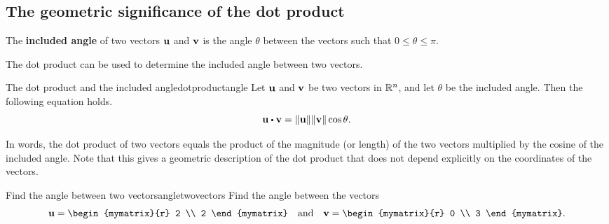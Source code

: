 \subsection{The geometric significance of the dot product}

The \textbf{included angle} of two vectors
$\mbox{\bf u}$ and $\mbox{\bf v}$ is the angle $\theta$ between the vectors
such that $0 \leq \theta \leq \pi$.
\begin{center}
\end{center}
The dot product can be used to determine the included angle between
two vectors.

\begin{proposition}{The dot product and the included angle}{dotproductangle}
  Let $\mbox{\bf u}$ and $\mbox{\bf v}$ be two vectors in $\mathbb{R}^n$, and let 
  $\theta$ be the included angle. Then the following equation holds.
  \begin{equation*}
    \vect{u}\dotprod \vect{v}=\norm{\vect{u}} \norm{\vect{v}} \cos \theta.
  \end{equation*}
\end{proposition}

In words, the dot product of two vectors equals the product of the
magnitude (or length) of the two vectors multiplied by the cosine of
the included angle. Note that this gives a geometric description of
the dot product that does not depend explicitly on the coordinates of
the vectors.

\begin{example}{Find the angle between two vectors}{angletwovectors}
Find the angle between the vectors
\begin{equation*}
  \vect{u}
  =
  \begin{mymatrix}{r}
    2 \\
    2
  \end{mymatrix}
  \quad\mbox{and}\quad
  \vect{v}
  =
  \begin{mymatrix}{r}
    0 \\
    3 
  \end{mymatrix}.
\end{equation*}
\end{example}

